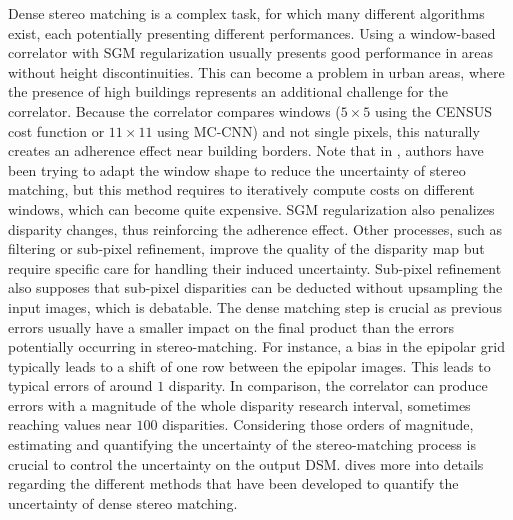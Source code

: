 Dense stereo matching is a complex task, for which many different algorithms exist, each potentially presenting different performances. Using a window-based correlator with SGM regularization usually presents good performance in areas without height discontinuities. This can become a problem in urban areas, where the presence of high buildings represents an additional challenge for the correlator. Because the correlator compares windows ($5\times5$ using the CENSUS cost function or $11\times11$ using MC-CNN) and not single pixels, this naturally creates an adherence effect near building borders. Note that in \cite{okutomi_stereo_1994}, authors have been trying to adapt the window shape to reduce the uncertainty of stereo matching, but this method requires to iteratively compute costs on different windows, which can become quite expensive. SGM regularization also penalizes disparity changes, thus reinforcing the adherence effect. Other processes, such as filtering or sub-pixel refinement, improve the quality of the disparity map but require specific care for handling their induced uncertainty. Sub-pixel refinement also supposes that sub-pixel disparities can be deducted without upsampling the input images, which is debatable. The dense matching step is crucial as previous errors usually have a smaller impact on the final product than the errors potentially occurring in stereo-matching. For instance, a bias in the epipolar grid typically leads to a shift of one row between the epipolar images. This leads to typical errors of around $1$ disparity. In comparison, the correlator can produce errors with a magnitude of the whole disparity research interval, sometimes reaching values near $100$ disparities. Considering those orders of magnitude, estimating and quantifying the uncertainty of the stereo-matching process is crucial to control the uncertainty on the output DSM.  dives more into details regarding the different methods that have been developed to quantify the uncertainty of dense stereo matching.

